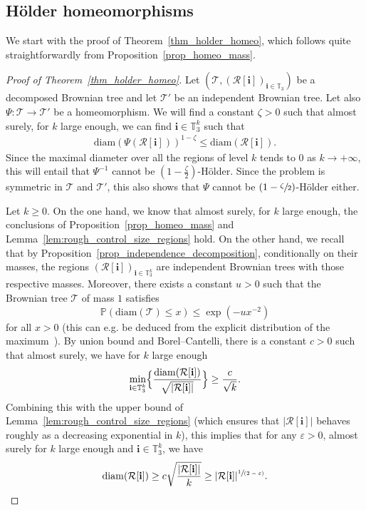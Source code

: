 \documentclass[JEP,XML,SOM,Unicode,NoFloatCountersInSection,published]{cedram}
\newcommand{\spfrac}[2]{\sfrac{#1}{(#2)}}
\newcommand{\Pp}[1]{\mathbb{P} \left(#1\right)}
\newcommand{\Tt}{\mathcal{T}}
\newcommand{\Rr}{\mathcal{R}}
\newcommand{\ii}{\mathbf{i}}
\newcommand{\diam}{\mathrm{diam}}
\let\eps\varepsilon
\theoremstyle{plain}
\theoremstyle{definition}
\begin{document}
\subsection{Hölder homeomorphisms}
We start with the proof of Theorem~\ref{thm_holder_homeo}, which follows quite straightforwardly from Proposition~\ref{prop_homeo_mass}.
\begin{proof}[Proof of Theorem~\ref{thm_holder_homeo}]
Let $\left( \Tt, \left( \Rr[\ii] \right)_{\ii \in \mathbb{T}_3} \right)$ be a decomposed Brownian tree and let $\Tt'$ be an independent Brownian tree. Let also $\Psi:\Tt\rightarrow\Tt'$ be a homeomorphism. We will find a constant $\zeta>0$ such that almost surely, for $k$ large enough, we can find $\ii \in \mathbb{T}_3^k$ such that
\begin{align}
\diam(\Psi(\Rr[\ii ]))^{1-\zeta}\leq \diam(\Rr[\ii ]).
\end{align}
Since the maximal diameter over all the regions of level $k$ tends to $0$ as $k \to +\infty$, this will entail that $\Psi^{-1}$ cannot be $(1-\frac{\zeta}{2})$-Hölder.
Since the problem is symmetric in $\Tt$ and $\Tt'$, this also shows that $\Psi$ cannot be $(1-\sfrac{\zeta}{2})$-Hölder either.

Let $k \geq 0$. On the one hand, we know that almost surely, for $k$ large enough, the conclusions of Proposition~\ref{prop_homeo_mass} and Lemma~\ref{lem:rough_control_size_regions} hold. On the other hand, we recall that by Proposition~\ref{prop_independence_decomposition}, conditionally on their masses, the regions $(\Rr[\ii ])_{\ii \in
\mathbb{T}_3^k}$ are independent Brownian trees with those respective masses.
Moreover, there exists a constant $u>0$ such that the Brownian tree $\Tt$ of mass $1$ satisfies
\[\Pp{\diam(\Tt)\leq x} \leq \exp(-ux^{-2})\]
for all $x>0$ (this can e.g. be deduced from the explicit distribution of the maximum~\cite{kennedy_distribution_1976}). By union bound and Borel--Cantelli, there is a constant $c>0$ such that almost surely, we have for $k$ large enough
\begin{align*}
\min_{\ii \in \mathbb{T}_3^k} \Bigl\lbrace\frac{\diam (\Rr[\ii ])}{\sqrt{|\Rr[\ii ]|}} \Bigr\rbrace \geq \frac{c}{\sqrt{k}}.
\end{align*}
Combining this with the upper bound of Lemma~\ref{lem:rough_control_size_regions} (which ensures that $|\Rr[\ii]|$ behaves roughly as a decreasing exponential in $k$),
this implies that for any $\eps>0$, almost surely for $k$ large enough and $\ii \in \mathbb{T}_3^k$, we have
\begin{equation}\label{eq:diam is at least mass to the half minus epsilon}
\diam (\Rr[\ii ]) \geq c \sqrt{\frac{|\Rr[\ii ]|}{k}} \geq |\Rr[\ii ]|^{\spfrac{1}{2-\eps}}.
\end{equation}


\end{proof}
\end{document}
